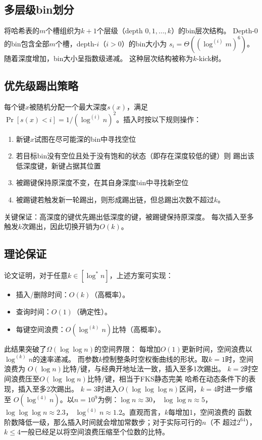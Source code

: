 \documentclass[
    type = bachelor,
    fontset = win,
    decl-page = true,
  ]{njuthesis}
\begin{document}
\subsection{多层级bin划分}

将哈希表的$m$个槽组织为$k+1$个层级（depth $0,1,\ldots,k$）的bin层次结构。
Depth-0的bin包含全部$m$个槽，depth-$i$（$i>0$）的bin大小为
$s_i = \Theta((\log^{(i)} m)^6)$。随着深度增加，bin大小呈指数级递减。
这种层次结构被称为$k$-kick树。

\subsection{优先级踢出策略}

每个键$x$被随机分配一个最大深度$s(x)$，满足\cite{1}
$\Pr[s(x) < i] = 1/(\log^{(i)} n)^2$。插入时按以下规则操作：

\begin{enumerate}
  \item 新键$x$试图在尽可能深的bin中寻找空位
  \item 若目标bin没有空位且处于没有饱和的状态（即存在深度较低的键）则
    踢出该低深度键，新键占据其位置
  \item 被踢键保持原深度不变，在其自身深度bin中寻找新空位
  \item 被踢键若触发新一轮踢出，则形成踢出链，但总踢出次数不超过$k$。
\end{enumerate}

关键保证：高深度的键优先踢出低深度的键，被踢键保持原深度。
每次插入至多触发$k$次踢出，因此切换开销为$O(k)$。

\subsection{理论保证}

论文\cite{1}证明，对于任意$k \in [\log^* n]$，上述方案可实现：
\begin{itemize}
  \item 插入/删除时间：$O(k)$（高概率）。
  \item 查询时间：$O(1)$（确定性）。
  \item 每键空间浪费：$O(\log^{(k)} n)$比特（高概率）。
\end{itemize}

此结果\cite{1}突破了$\Omega(\log\log n)$的空间界限：
每增加$O(1)$更新时间，空间浪费以$\log^{(k)} n$的速率递减。
而参数$k$控制整条时空权衡曲线的形状。取$k=1$时，空间浪费为
$O(\log n)$比特/键，与经典开地址法一致，插入至多1次踢出。
$k=2$时空间浪费压至$O(\log\log n)$比特/键，相当于FKS静态完美
哈希\cite{10}在动态条件下的表现，插入至多2次踢出。
$k=3$时进入$O(\log\log\log n)$区间，$k=4$时进一步缩至
$O(\log^{(4)} n)$。以$n=10^9$为例：$\log n\approx 30$，
$\log\log n\approx 5$，$\log\log\log n\approx 2.3$，
$\log^{(4)} n\approx 1.2$。直观而言，$k$每增加1，空间浪费的
函数阶数降低一级，那么插入时间就会增加常数步；对于实际可行的$n$（不
超过$2^{64}$），$k\le 4$一般已经足以将空间浪费压缩至个位数的比特。
\end{document}
